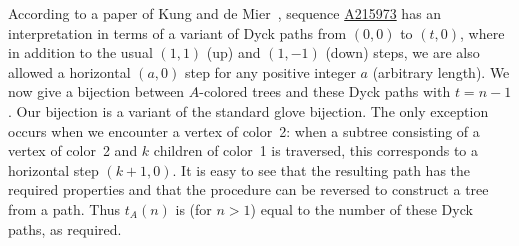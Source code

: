 \documentclass[12pt]{amsart}
\newcommand{\seqnum}[1]{\href{https://oeis.org/#1}{#1}}
\begin{document}
\begin{description}
According to a paper of Kung and de Mier~\cite{Kung2013Catalan}, sequence \seqnum{A215973} has an interpretation in terms of
a variant of Dyck paths from $(0,0)$ to $(t,0)$, where in addition to the usual $(1,1)$ (up) and $(1,-1)$ (down) steps, we are also allowed a horizontal $(a,0)$ step for any positive integer $a$ (arbitrary length).
We now give a bijection between $A$-colored trees and these Dyck paths with $t=n-1$.
Our bijection is a variant of the standard glove bijection. 
The only exception occurs when we encounter a vertex of color~2: when a subtree consisting of a vertex of color~2 and $k$ children of color~1 is traversed, this corresponds to a 
horizontal step $(k+1,0)$.
It is easy to see that the resulting path has the required properties and that the procedure can be reversed to construct a tree from a path. Thus $t_A(n)$ is (for $n > 1$) equal to the number of these Dyck paths,
as required.
\end{description}
\end{document}
